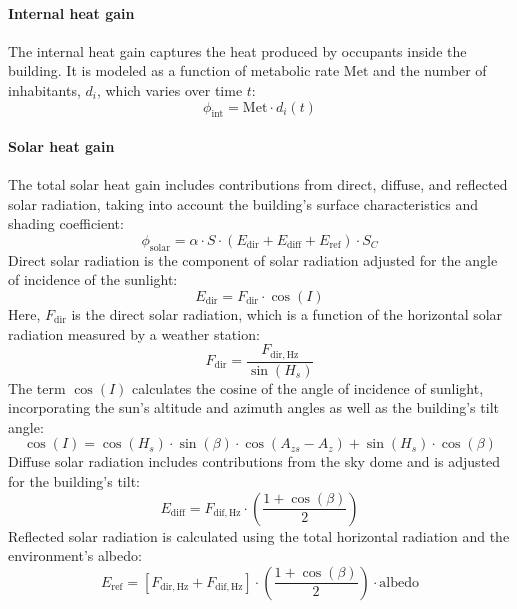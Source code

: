 \documentclass[runningheads]{llncs}
\begin{document}
\paragraph{Internal heat gain} The internal heat gain captures the heat produced by occupants inside the building. 
It is modeled as a function of metabolic rate $\mathrm{Met}$ and the number of inhabitants, $d_i$, which varies over time $t$:
\begin{equation}
  \phi_{\mathrm{int}} = \mathrm{Met} \cdot d_i(t)
\end{equation}

\paragraph{Solar heat gain} The total solar heat gain includes contributions from direct, diffuse, and reflected solar radiation, taking into account the building’s surface characteristics and shading coefficient:
\begin{equation}
  \phi_{\mathrm{solar}} = \alpha \cdot S \cdot \left( E_{\mathrm{dir}} + E_{\mathrm{diff}} + E_{\mathrm{ref}} \right) \cdot S_C
\end{equation}
Direct solar radiation is the component of solar radiation adjusted for the angle of incidence of the sunlight:
\begin{equation}
  E_{\mathrm{dir}} = F_{\mathrm{dir}} \cdot \cos(I)
\end{equation}
Here, $F_{\mathrm{dir}}$ is the direct solar radiation, which is a function of the horizontal solar radiation measured by a weather station:
\begin{equation}
  F_{\mathrm{dir}} = \dfrac{F_{\mathrm{dir,Hz}}}{\sin(H_s)}
\end{equation}
The term $\cos(I)$ calculates the cosine of the angle of incidence of sunlight, incorporating the sun's altitude and azimuth angles as well as the building's tilt angle:
\begin{equation}
  \cos(I) = \cos(H_s) \cdot \sin(\beta) \cdot \cos(A_{zs} - A_z) + \sin(H_s) \cdot \cos(\beta)
\end{equation}
Diffuse solar radiation includes contributions from the sky dome and is adjusted for the building's tilt:
\begin{equation}
  E_{\mathrm{diff}} = F_{\mathrm{dif,Hz}} \cdot \left( \dfrac{1 + \cos(\beta)}{2} \right)
\end{equation}
Reflected solar radiation is calculated using the total horizontal radiation and the environment's albedo:
\begin{equation}
  E_{\mathrm{ref}} = \left[ F_{\mathrm{dir,Hz}} + F_{\mathrm{dif,Hz}} \right] \cdot \left( \dfrac{1 + \cos(\beta)}{2} \right) \cdot \text{albedo}
\end{equation}
\end{document}
